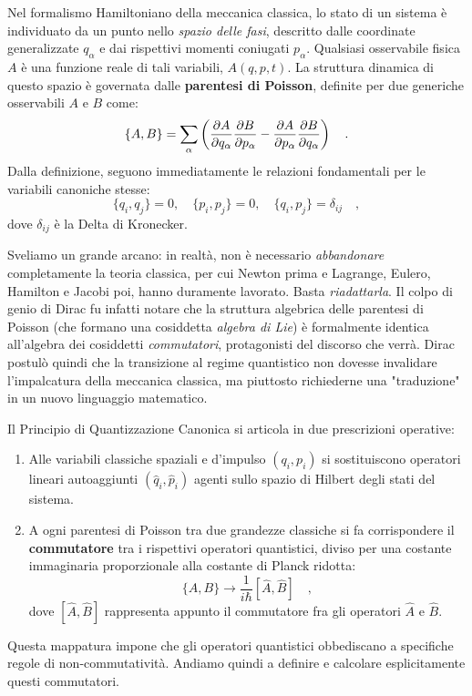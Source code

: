 Nel formalismo Hamiltoniano della meccanica classica, lo stato di un sistema è individuato da un punto nello \emph{spazio delle fasi}, descritto dalle coordinate generalizzate $q_\alpha$ e dai rispettivi momenti coniugati $p_\alpha$. Qualsiasi osservabile fisica $A$ è una funzione reale di tali variabili, $A(q,p,t)$. La struttura dinamica di questo spazio è governata dalle \textbf{parentesi di Poisson}, definite per due generiche osservabili $A$ e $B$ come:
\begin{equation*}
    \{A, B\} = \sum_\alpha \left( \pdv{A}{q_\alpha}\pdv{B}{p_\alpha} - \pdv{A}{p_\alpha }\pdv{B}{q_\alpha} \right) \quad.
\end{equation*}
Dalla definizione, seguono immediatamente le relazioni fondamentali per le variabili canoniche stesse:
\begin{equation}
    \{q_i, q_j\} = 0, \quad \{p_i, p_j\} = 0, \quad \{q_i, p_j\} = \delta_{ij} \quad,
\end{equation}
dove $\delta_{ij}$ è la Delta di Kronecker.

Sveliamo un grande arcano: in realtà, non è necessario \emph{abbandonare} completamente la teoria classica, per cui Newton prima e Lagrange, Eulero, Hamilton e Jacobi poi, hanno duramente lavorato. Basta \emph{riadattarla}. Il colpo di genio di Dirac fu infatti notare che la struttura algebrica delle parentesi di Poisson (che formano una cosiddetta \emph{algebra di Lie}) è formalmente identica all'algebra dei cosiddetti \emph{commutatori}, protagonisti del discorso che verrà. Dirac postulò quindi che la transizione al regime quantistico non dovesse invalidare l'impalcatura della meccanica classica, ma piuttosto richiederne una "traduzione" in un nuovo linguaggio matematico. 

Il Principio di Quantizzazione Canonica si articola in due prescrizioni operative:
\begin{enumerate}
    \item Alle variabili classiche spaziali e d'impulso $(q_i, p_i)$ si sostituiscono operatori lineari autoaggiunti $(\hat{q}_i, \hat{p}_i)$ agenti sullo spazio di Hilbert degli stati del sistema.
    \item A ogni parentesi di Poisson tra due grandezze classiche si fa corrispondere il \textbf{commutatore} tra i rispettivi operatori quantistici, diviso per una costante immaginaria proporzionale alla costante di Planck ridotta:
    \begin{equation}
        \{A, B\} \longrightarrow \frac{1}{i\hbar}[\hat{A}, \hat{B}] \quad,
        \label{eq:quantizzazione_dirac}
    \end{equation}
    dove $[\hat{A}, \hat{B}]$ rappresenta appunto il commutatore fra gli operatori $\hat{A}$ e $\hat{B}$.
\end{enumerate}
Questa mappatura impone che gli operatori quantistici obbediscano a specifiche regole di non-commutatività. Andiamo quindi a definire e calcolare esplicitamente questi commutatori.


